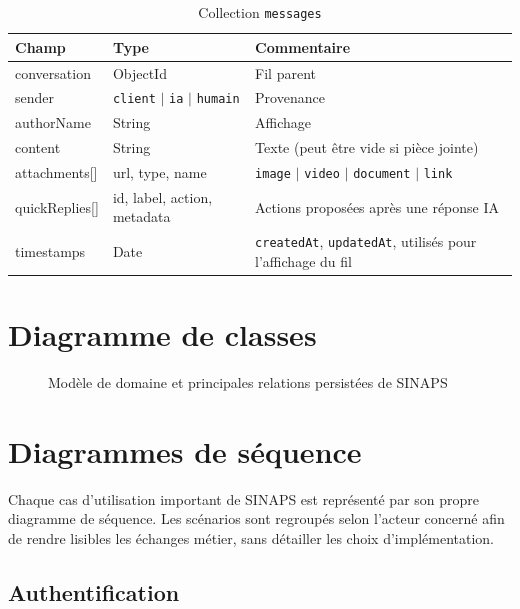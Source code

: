 \begin{table}[H]
\centering
\caption{Collection \texttt{messages}}
\label{tab:msg}
\begin{tabularx}{\textwidth}{|l|l|X|}
\hline
Champ & Type & Commentaire \\
\hline
conversation & ObjectId & Fil parent \\
\hline
sender & \texttt{client} $\mid$ \texttt{ia} $\mid$ \texttt{humain} & Provenance \\
\hline
authorName & String & Affichage \\
\hline
content & String & Texte (peut être vide si pièce jointe) \\
\hline
attachments[] & url, type, name & \texttt{image} $\mid$ \texttt{video} $\mid$ \texttt{document} $\mid$ \texttt{link} \\
\hline
quickReplies[] & id, label, action, metadata & Actions proposées après une réponse IA \\
\hline
timestamps & Date & \texttt{createdAt}, \texttt{updatedAt}, utilisés pour l'affichage du fil \\
\hline
\end{tabularx}
\end{table}

\section{Diagramme de classes}

\begin{figure}[H]
\centering

\caption{Modèle de domaine et principales relations persistées de SINAPS}
\label{fig:classes}
\end{figure}

\section{Diagrammes de séquence}

\noindent Chaque cas d'utilisation important de SINAPS est représenté par son propre diagramme de séquence. Les scénarios sont regroupés selon l'acteur concerné afin de rendre lisibles les échanges métier, sans détailler les choix d'implémentation.

\subsection{Authentification}

